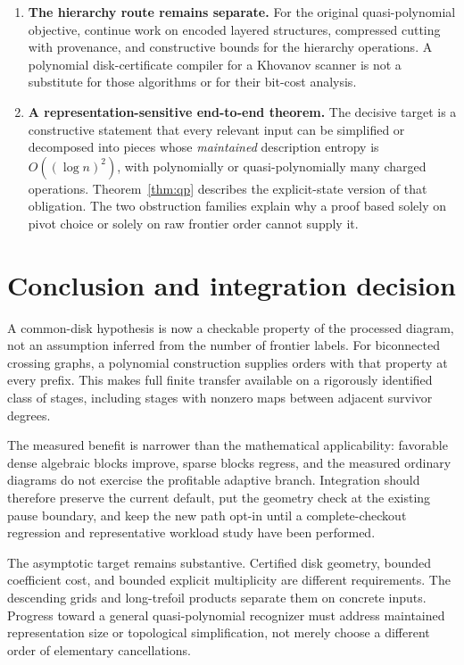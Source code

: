 \documentclass[11pt]{article}
\theoremstyle{definition}\newtheorem{definition}[theorem]{Definition}
\theoremstyle{remark}\newtheorem{remark}[theorem]{Remark}
\begin{document}
\begin{enumerate}[label=\textbf{Q\arabic*.},leftmargin=2.8em,itemsep=7pt]
\item \textbf{The hierarchy route remains separate.}
For the original quasi-polynomial objective, continue work on encoded layered
structures, compressed cutting with provenance, and constructive bounds for the
hierarchy operations. A polynomial disk-certificate compiler for a Khovanov
scanner is not a substitute for those algorithms or for their bit-cost analysis.

\item \textbf{A representation-sensitive end-to-end theorem.}
The decisive target is a constructive statement that every relevant input can
be simplified or decomposed into pieces whose \emph{maintained} description
entropy is $O((\log n)^2)$, with polynomially or quasi-polynomially many charged
operations. Theorem~\ref{thm:qp} describes the explicit-state version of that
obligation. The two obstruction families explain why a proof based solely on
pivot choice or solely on raw frontier order cannot supply it.
\end{enumerate}

\section{Conclusion and integration decision}
A common-disk hypothesis is now a checkable property of the processed diagram,
not an assumption inferred from the number of frontier labels. For biconnected
crossing graphs, a polynomial construction supplies orders with that property
at every prefix. This makes full finite transfer available on a rigorously
identified class of stages, including stages with nonzero maps between adjacent
survivor degrees.

The measured benefit is narrower than the mathematical applicability: favorable
dense algebraic blocks improve, sparse blocks regress, and the measured ordinary
diagrams do not exercise the profitable adaptive branch. Integration should
therefore preserve the current default, put the geometry check at the existing
pause boundary, and keep the new path opt-in until a complete-checkout regression
and representative workload study have been performed.

The asymptotic target remains substantive. Certified disk geometry, bounded
coefficient cost, and bounded explicit multiplicity are different requirements.
The descending grids and long-trefoil products separate them on concrete inputs.
Progress toward a general quasi-polynomial recognizer must address maintained
representation size or topological simplification, not merely choose a different
order of elementary cancellations.
\end{document}
